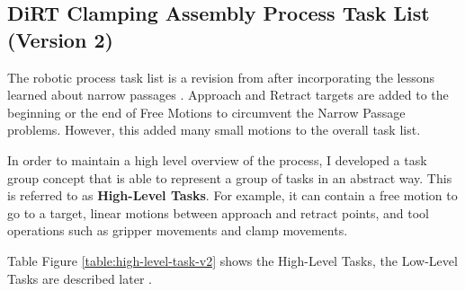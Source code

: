 \subsection{DiRT Clamping Assembly Process Task List (Version 2)}
\label{subsection:exploration-3-dirt-clamping-assembly-process-task-list-v2}

The robotic process task list is a revision from  after incorporating the lessons learned about narrow passages . Approach and Retract targets are added to the beginning or the end of Free Motions to circumvent the Narrow Passage problems. However, this added many small motions to the overall task list.

In order to maintain a high level overview of the process, I developed a task group concept that is able to represent a group of tasks in an abstract way. This is referred to as \textbf{High-Level Tasks}. For example, it can contain a free motion to go to a target, linear motions between approach and retract points, and tool operations such as gripper movements and clamp movements.

Table Figure \ref{table:high-level-task-v2} shows the High-Level Tasks, the Low-Level Tasks are described later .

